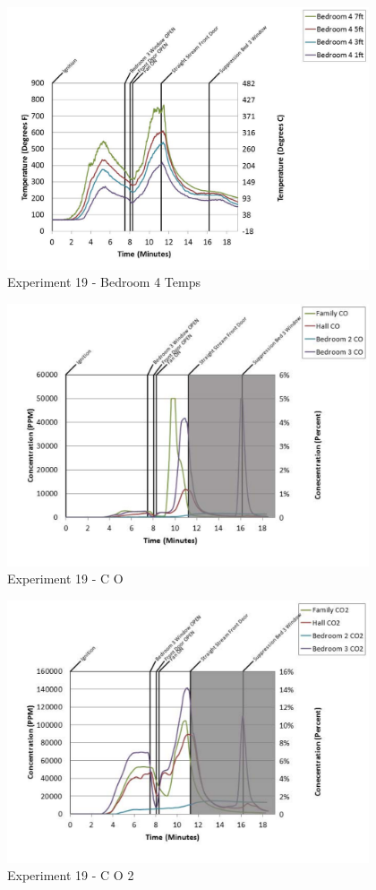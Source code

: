 \documentclass{article}
\begin{document}
\begin{appendices}
	\clearpage

	\begin{figure}[h!]
		\centering
		\includegraphics[height=3.05in]{0_Images/Results_Charts/Exp_19_Charts/Bedroom4Temps.pdf}
		\caption{Experiment 19 - Bedroom 4 Temps}
	\end{figure}
 

	\begin{figure}[h!]
		\centering
		\includegraphics[height=3.05in]{0_Images/Results_Charts/Exp_19_Charts/CO.pdf}
		\caption{Experiment 19 - C O}
	\end{figure}
 
	\clearpage

	\begin{figure}[h!]
		\centering
		\includegraphics[height=3.05in]{0_Images/Results_Charts/Exp_19_Charts/CO2.pdf}
		\caption{Experiment 19 - C O 2}
	\end{figure}
 


\end{appendices}
\end{document}

